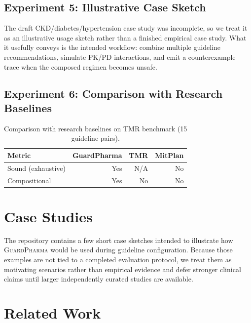 \documentclass{article}
\theoremstyle{definition}
\begin{document}
\subsection{Experiment 5: Illustrative Case Sketch}

The draft CKD/diabetes/hypertension case study was incomplete, so we treat it
as an illustrative usage sketch rather than a finished empirical case study.
What it usefully conveys is the intended workflow: combine multiple guideline
recommendations, simulate PK/PD interactions, and emit a counterexample trace
when the composed regimen becomes unsafe.

\subsection{Experiment 6: Comparison with Research Baselines}

\begin{table}[H]
\centering
\caption{Comparison with research baselines on TMR benchmark (15 guideline pairs).}
\label{tab:baselines}
\begin{tabular}{@{}lrrr@{}}
\toprule
\textbf{Metric} & \textbf{GuardPharma} & \textbf{TMR} & \textbf{MitPlan} \\
\midrule
Sound (exhaustive) & Yes & N/A & No \\
Compositional & Yes & No & No \\
\bottomrule
\end{tabular}
\end{table}


\section{Case Studies}
\label{sec:cases}

The repository contains a few short case sketches intended to illustrate how
\textsc{GuardPharma} would be used during guideline configuration.  Because those
examples are not tied to a completed evaluation protocol, we treat them as
motivating scenarios rather than empirical evidence and defer stronger clinical
claims until larger independently curated studies are available.

\section{Related Work}
\label{sec:related}
\end{document}
